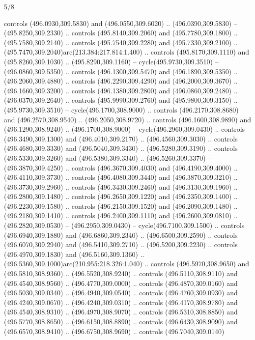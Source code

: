 \begin{flagdescription}{5/8}
\begin{scope}[xshift=0.5\flaglength,yshift=0.5\flagwidth,scale=\flagwidth/475.63]
\begin{scope}[y=0.8pt, x=0.8pt, yscale=-1, xscale=1,shift={(-450,-300)}]
\begin{scope}[cm={{1.0,0.0,0.0,1.0,(-0.0002,0.12556)}},cm={{1.0,0.0,0.0,1.0,(0.00179,0.0)}}]
\begin{scope}[cm={{1.11592,0.0,0.0,1.11592,(-106.89933,-41.77764)}}]
\begin{scope}[draw=black,fill=cfff]
\begin{scope}[fill=black]
  controls (496.0930,309.5830) and (496.0550,309.6020) .. (496.0390,309.5830) --
  (495.8250,309.2330) .. controls (495.8140,309.2060) and (495.7780,309.1800) ..
  (495.7580,309.2140) .. controls (495.7540,309.2280) and (495.7330,309.2100) ..
  (495.7470,309.2040)arc(213.384:217.814:1.400) .. controls (495.8170,309.1110)
  and (495.8260,309.1030) .. (495.8290,309.1160) -- cycle(495.9730,309.3510) --
  (496.0860,309.5350) .. controls (496.1300,309.5470) and (496.1890,309.5350) ..
  (496.2060,309.4880) .. controls (496.2290,309.4290) and (496.2000,309.3670) ..
  (496.1660,309.3200) .. controls (496.1380,309.2800) and (496.0860,309.2480) ..
  (496.0370,309.2640) .. controls (495.9990,309.2760) and (495.9800,309.3150) ..
  (495.9730,309.3510) -- cycle(496.1700,308.9000) .. controls
  (496.2170,308.8680) and (496.2570,308.9540) .. (496.2050,308.9720) .. controls
  (496.1600,308.9890) and (496.1290,308.9240) .. (496.1700,308.9000) --
  cycle(496.2960,309.0430) .. controls (496.3490,309.1300) and
  (496.4010,309.2170) .. (496.4560,309.3030) .. controls (496.4680,309.3330) and
  (496.5040,309.3430) .. (496.5280,309.3190) .. controls (496.5330,309.3260) and
  (496.5380,309.3340) .. (496.5260,309.3370) -- (496.3870,309.4250) .. controls
  (496.3670,309.4030) and (496.4190,309.4000) .. (496.4110,309.3730) .. controls
  (496.4080,309.3440) and (496.3870,309.3210) .. (496.3730,309.2960) .. controls
  (496.3430,309.2460) and (496.3130,309.1960) .. (496.2800,309.1480) .. controls
  (496.2650,309.1220) and (496.2350,309.1400) .. (496.2230,309.1580) .. controls
  (496.2150,309.1520) and (496.2090,309.1480) .. (496.2180,309.1410) .. controls
  (496.2400,309.1110) and (496.2600,309.0810) .. (496.2820,309.0530) --
  (496.2950,309.0430) -- cycle(496.7100,309.1500) .. controls
  (496.6940,309.1880) and (496.6860,309.2340) .. (496.6500,309.2590) .. controls
  (496.6070,309.2940) and (496.5410,309.2710) .. (496.5200,309.2230) .. controls
  (496.4970,309.1830) and (496.5160,309.1360) ..
  (496.5360,309.1000)arc(210.955:218.326:1.040) .. controls (496.5970,308.9650)
  and (496.5810,308.9360) .. (496.5520,308.9240) .. controls (496.5110,308.9110)
  and (496.4540,308.9560) .. (496.4770,309.0000) .. controls (496.4870,309.0160)
  and (496.5030,309.0340) .. (496.4940,309.0540) .. controls (496.4760,309.0930)
  and (496.4240,309.0670) .. (496.4240,309.0310) .. controls (496.4170,308.9780)
  and (496.4540,308.9310) .. (496.4970,308.9070) .. controls (496.5310,308.8850)
  and (496.5770,308.8650) .. (496.6150,308.8890) .. controls (496.6430,308.9090)
  and (496.6570,308.9410) .. (496.6750,308.9690) .. controls (496.7040,309.0140)

\end{scope}
\end{scope}
\end{scope}
\end{scope}
\end{scope}
\end{scope}
\end{flagdescription}
